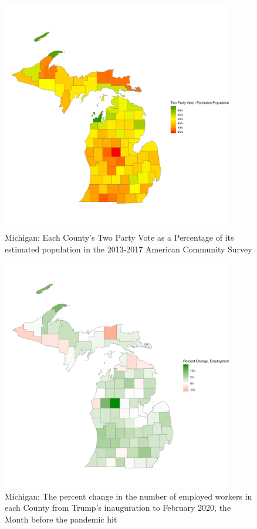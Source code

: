 \documentclass[11pt]{article}
\begin{document}
\begin{figure}
    \centering
    \includegraphics[width=0.9\textwidth]{plots/turnout.png}
    \caption{Michigan: Each County's Two Party Vote as a Percentage of its estimated population in the 2013-2017 American Community Survey}
    \label{fig:turnout}
\end{figure}
\begin{figure}
    \centering
    \includegraphics[width=0.9\textwidth]{plots/raw-employment-plot.png}
    \caption{Michigan: The percent change in the number of employed workers in each County from Trump's inauguration to February 2020, the Month before the pandemic hit}
\end{figure}
\end{document}
